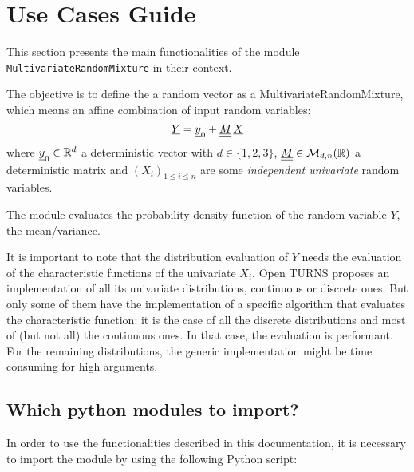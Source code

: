 



\section{Use Cases Guide}

This section presents the main functionalities of the module \texttt{MultivariateRandomMixture} in their context.


The objective is to define the a random vector as a MultivariateRandomMixture, which means an affine combination of input random variables:
$$
{\underline{Y}}={\underline{y}}_0+{\underline{\underline{M}}}\,{\underline{X}}
$$
where ${\underline{y}}_0\in\mathbb{R}^d$ a deterministic vector with  $d\in\{1,2,3\}$, ${\underline{\underline{M}}}\in\mathcal{M}_{d,n}(\mathbb{R})$ a deterministic matrix
and $(X_i)_{ 1 \leq i \leq n}$ are some  \emph{independent univariate} random variables.

The module evaluates the probability density function of the random variable $Y$, the mean\slash variance.

It is important to note that the distribution evaluation of $Y$ needs the evaluation of the characteristic functions of the univariate $X_i$. 
Open TURNS proposes an implementation of all its univariate distributions, continuous or discrete ones. 
But only some of them have the implementation of a specific algorithm that evaluates the characteristic function: 
it is the case of all the discrete distributions and most of (but not all) the continuous ones. 
In that case, the evaluation is performant. 
For the remaining distributions, the generic implementation might be time consuming for high arguments.


\subsection{Which python modules to import?}

In order to use the functionalities described in this documentation, it is necessary to import the module 
by using the following Python script:

